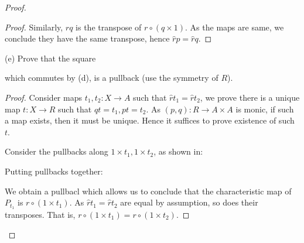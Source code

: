 \documentclass[a4paper]{article}
\begin{document}
\begin{proof}
\begin{proof}
        Similarly, $\hat{r}q$ is the transpose of $r\circ (q\times 1)$. As the maps are same, we conclude they have the same transpose, hence $\hat{r}p=\hat{r}q$.
    \end{proof}

    (e) Prove that the square 

    \begin{center}
    \end{center}

    which commutes by (d), is a pullback (use the symmetry of $R$).

    \begin{proof}
        Consider maps $t_1,t_2:X\to A$ such that $\hat{r}t_1=\hat{r}t_2$, we prove there is a unique map $t:X\to R$ such that $qt=t_1,pt=t_2$. As $(p,q):R\to A\times A$ is monic, if such a map exists, then it must be unique. Hence it suffices to prove existence of such $t$. 

        Consider the pullbacks along $1\times t_1,1\times t_2$, as shown in:
        
        \begin{center}
        \end{center}

        Putting pullbacks together:

        \begin{center}
        \end{center}

        We obtain a pullbacl which allows us to conclude that the characteristic map of $P_{t_1}$ is $r\circ (1\times t_1)$. As $\hat{r}t_1 = \hat{r}t_2$ are equal by assumption, so does their transposes. That is, $r\circ (1\times t_1)= r\circ (1\times t_2)$.


\end{proof}
\end{proof}
\end{document}
